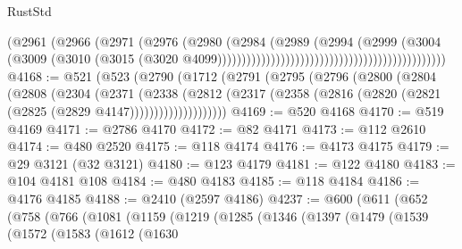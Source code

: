 \begin{lexlean}{RustStd}
\begin{coremodule}
{\begin{coremodule}
{{{{{{{{{{{{{{{{{{{{{{{{{{{{{{{{{{{{{{{{{{{{{{{{{{{{{{{                                                                      (@2961
                                                                        (@2966
                                                                          (@2971
                                                                            (@2976
                                                                              (@2980
                                                                                (@2984
                                                                                  (@2989
                                                                                    (@2994
                                                                                      (@2999
                                                                                        (@3004
                                                                                          (@3009
                                                                                            (@3010
                                                                                              (@3015
                                                                                                (@3020
                                                                                                  @4099)))))))))))))))))))))))))))))))))))))))))))))))
@4168 := @521
    (@523
      (@2790
        (@1712
          (@2791
            (@2795
              (@2796
                (@2800
                  (@2804
                    (@2808
                      (@2304
                        (@2371
                          (@2338
                            (@2812
                              (@2317
                                (@2358 (@2816 (@2820 (@2821 (@2825 (@2829 @4147))))))))))))))))))))
@4169 := @520 @4168
@4170 := @519 @4169
@4171 := @2786 @4170
@4172 := @82 @4171
@4173 := @112 @2610
@4174 := @480 @2520
@4175 := @118 @4174
@4176 := @4173 @4175
@4179 := @29 @3121 (@32 @3121)
@4180 := @123 @4179
@4181 := @122 @4180
@4183 := @104 @4181 @108
@4184 := @480 @4183
@4185 := @118 @4184
@4186 := @4176 @4185
@4188 := @2410 (@2597 @4186)
@4237 := @600
    (@611
      (@652
        (@758
          (@766
            (@1081
              (@1159
                (@1219
                  (@1285
                    (@1346
                      (@1397
                        (@1479
                          (@1539
                            (@1572
                              (@1583
                                (@1612
                                  (@1630
}}}}}}}}}}}}}}}}}}}}}}}}}}}}}}}}}}}}}}}}}}}}}}}}}}}}}}}
\end{coremodule}}
\end{coremodule}
\end{lexlean}
